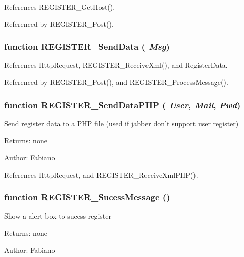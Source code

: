 References REGISTER\_\-GetHost().

Referenced by REGISTER\_\-Post().
\subsubsection{\setlength{\rightskip}{0pt plus 5cm}function REGISTER\_\-SendData ( {\em Msg})}\label{register_8js_fcb0616848b3086105c609ff09fb56c2}




References HttpRequest, REGISTER\_\-ReceiveXml(), and RegisterData.

Referenced by REGISTER\_\-Post(), and REGISTER\_\-ProcessMessage().
\subsubsection{\setlength{\rightskip}{0pt plus 5cm}function REGISTER\_\-SendDataPHP ( {\em User}, \/   {\em Mail}, \/   {\em Pwd})}\label{register_8js_6785efd4f9728ecdfca686884a471657}


Send register data to a PHP file (used if jabber don't support user register) \begin{Desc}
\item[Returns:]none\end{Desc}
\begin{Desc}
\item[Author:]Fabiano \end{Desc}


References HttpRequest, and REGISTER\_\-ReceiveXmlPHP().
\subsubsection{\setlength{\rightskip}{0pt plus 5cm}function REGISTER\_\-SucessMessage ()}\label{register_8js_f16ca40e345d5c80f16a10b57e8b5707}


Show a alert box to sucess register

\begin{Desc}
\item[Returns:]none \end{Desc}
\begin{Desc}
\item[Author:]Fabiano \end{Desc}


